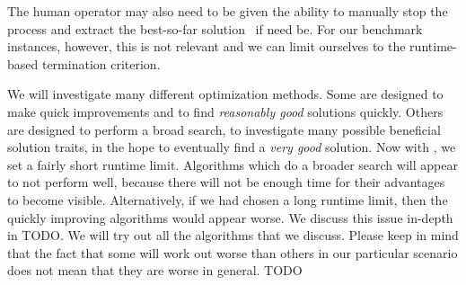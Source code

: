 The human operator may also need to be given the ability to manually stop the process and extract the best-so-far solution~\bestSoFarOf{\solspel} if need be.
For our benchmark instances, however, this is not relevant and we can limit ourselves to the runtime-based termination criterion.

We will investigate many different optimization methods.
Some are designed to make quick improvements and to find \emph{reasonably good} solutions quickly.
Others are designed to perform a broad search, to investigate many possible beneficial solution traits, in the hope to eventually find a \emph{very good} solution.
Now with \jsspRuntime, we set a fairly short runtime limit.
Algorithms which do a broader search will appear to not perform well, because there will not be enough time for their advantages to become visible.
Alternatively, if we had chosen a long runtime limit, then the quickly improving algorithms would appear worse.
We discuss this issue in-depth in TODO.
We will try out all the algorithms that we discuss.
Please keep in mind that the fact that some will work out worse than others in our particular scenario does not mean that they are worse in general.
\endhsection%
%
%
TODO
\endhsection%
\endhsection%
%
